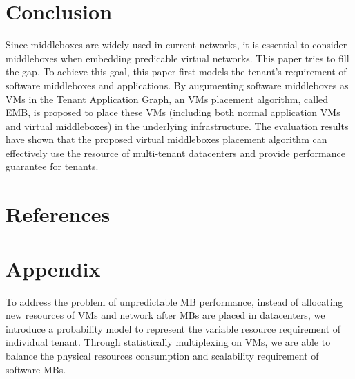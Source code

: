 \documentclass[review]{elsarticle}
\begin{document}

\section{Conclusion}\label{sec:final}
Since middleboxes are widely used in current networks, it is essential to consider middleboxes when embedding predicable virtual networks. This paper tries to fill the gap. To achieve this goal, this paper first models the tenant's requirement of software middleboxes and applications. By augumenting software middleboxes as VMs in the Tenant Application Graph, an VMs placement algorithm, called EMB, is proposed to place these VMs (including both normal application VMs and virtual middleboxes) in the underlying infrastructure. The evaluation results have shown that the proposed virtual middleboxes placement algorithm can effectively use the resource of multi-tenant datacenters and provide performance guarantee for tenants.   

 







\section*{References}



\section*{Appendix}
\appendix
To address the problem of unpredictable MB performance, instead of allocating new resources of VMs and network after MBs are placed in datacenters, we introduce a probability model to represent the variable resource requirement of individual tenant. Through statistically multiplexing on VMs, we are able to balance the physical resources consumption and scalability requirement of software MBs. 
\end{document}
